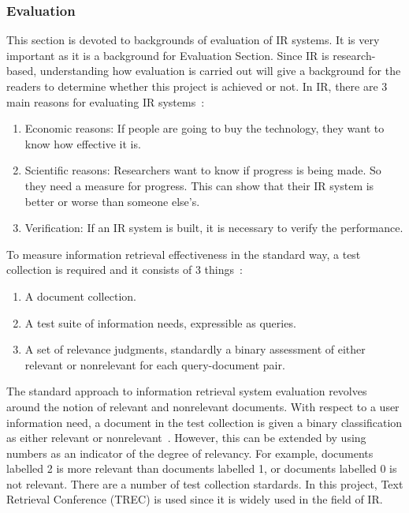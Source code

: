 \subsubsection{Evaluation}
This section is devoted to backgrounds of evaluation of IR systems. It is very important as it is a background for Evaluation Section. 
Since IR is research-based, understanding how evaluation is carried out will give a background for the readers to determine whether 
this project is achieved or not. In IR, there are 3 main reasons for evaluating IR systems~\cite[P. 3]{eval}: 
\begin{enumerate}
 \item Economic reasons: If people are going to buy the technology, they want to know how effective it is.
 \item Scientific reasons: Researchers want to know if progress is being made. So they need a measure for progress. 
	This can show that their IR system is better or worse than someone else's.
 \item Verification: If an IR system is built, it is necessary to verify the performance.
\end{enumerate}

To measure information retrieval effectiveness in the standard way, a test collection is required and it consists of 3 things~\cite{evalweb}:
\begin{enumerate}
 \item A document collection.
 \item A test suite of information needs, expressible as queries.
 \item A set of relevance judgments, standardly a binary assessment of either relevant or nonrelevant for each query-document pair.
\end{enumerate}

The standard approach to information retrieval system evaluation revolves around the notion of relevant and nonrelevant documents. With respect 
to a user information need, a document in the test collection is given a binary classification as either relevant or nonrelevant~\cite{evalweb}. However,
this can be extended by using numbers as an indicator of the degree of relevancy. For example, documents labelled 2 is more relevant than documents
labelled 1, or documents labelled 0 is not relevant. There are a number of test collection stardards. In this project, Text Retrieval Conference (TREC)
is used since it is widely used in the field of IR.


